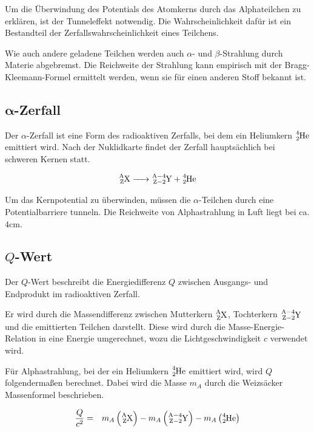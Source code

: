 \documentclass[12pt,a4paper]{scrartcl}
\numberwithin{equation}{section} %
\newcommand{\pu}[1]{\ensuremath{\mathrm{#1}}}
\renewcommand{\[}{} %
\renewcommand{\]}{\noindent} %
\begin{document}
Um die Überwindung des Potentials des Atomkerns durch das Alphateilchen
zu erklären, ist der Tunneleffekt notwendig. Die Wahrscheinlichkeit
dafür ist ein Bestandteil der Zerfallswahrscheinlichkeit eines
Teilchens.

Wie auch andere geladene Teilchen werden auch $\alpha$- und
$\beta$-Strahlung durch Materie abgebremst. Die Reichweite der
Strahlung kann empirisch mit der Bragg-Kleemann-Formel ermittelt werden,
wenn sie für einen anderen Stoff bekannt ist.

\hypertarget{pmbalpha-zerfall}{%
\subsection{\texorpdfstring{$\pmb{\alpha}$-Zerfall}{\textbackslash pmb\{\textbackslash alpha\}-Zerfall}}\label{pmbalpha-zerfall}}

Der $\alpha$-Zerfall ist eine Form des radioaktiven Zerfalls, bei dem
ein Heliumkern $\ce{^4_2He}$ emittiert wird. Nach der Nuklidkarte
findet der Zerfall hauptsächlich bei schweren Kernen statt.

\[
\begin{eqnarray}
        \ce{^A_ZX -> ^{A-4}_{Z-2}Y + ^4_2He}
\end{eqnarray}
\]

Um das Kernpotential zu überwinden, müssen die $\alpha$-Teilchen durch
eine Potentialbarriere tunneln. Die Reichweite von Alphastrahlung in
Luft liegt bei ca. $\pu{4 cm}$.

\hypertarget{q-wert}{%
\subsection{\texorpdfstring{$Q$-Wert}{Q-Wert}}\label{q-wert}}

Der $Q$-Wert beschreibt die Energiedifferenz $Q$ zwischen Ausgangs-
und Endprodukt im radioaktiven Zerfall.

Er wird durch die Massendifferenz zwischen Mutterkern $\ce{^A_ZX}$,
Tochterkern $\ce{^{A-4}_{Z-2}Y}$ und die emittierten Teilchen
darstellt. Diese wird durch die Masse-Energie-Relation in eine Energie
umgerechnet, wozu die Lichtgeschwindigkeit $c$ verwendet wird.

Für Alphastrahlung, bei der ein Heliumkern $\ce{^4_2He}$ emittiert
wird, wird $Q$ folgendermaßen berechnet. Dabei wird die Masse $m_A$
durch die Weizsäcker Massenformel beschrieben.

\[
\begin{eqnarray}
        \frac{Q}{c^2} &=&
                m_{A}
                        \left(\ce{^A_ZX}\right)
                        - m_{A}\left(\ce{^{A-4}_{Z-2}Y}\right)
                        - m_{A}\left(\ce{^4_2He}\right)
\end{eqnarray}
\]
\end{document}
